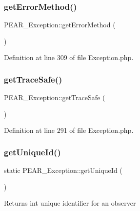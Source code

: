 \subsubsection{\texorpdfstring{get\+Error\+Method()}{getErrorMethod()}}
{\footnotesize\ttfamily P\+E\+A\+R\+\_\+\+Exception\+::get\+Error\+Method (\begin{DoxyParamCaption}{ }\end{DoxyParamCaption})}



Definition at line 309 of file Exception.\+php.

\mbox{\label{classPEAR__Exception_a6ddfe3065ec2af986b3e3fe267198515}} 
\subsubsection{\texorpdfstring{get\+Trace\+Safe()}{getTraceSafe()}}
{\footnotesize\ttfamily P\+E\+A\+R\+\_\+\+Exception\+::get\+Trace\+Safe (\begin{DoxyParamCaption}{ }\end{DoxyParamCaption})}



Definition at line 291 of file Exception.\+php.

\mbox{\label{classPEAR__Exception_af81b4e556fe7142e45ed9117b8cfb044}} 
\subsubsection{\texorpdfstring{get\+Unique\+Id()}{getUniqueId()}}
{\footnotesize\ttfamily static P\+E\+A\+R\+\_\+\+Exception\+::get\+Unique\+Id (\begin{DoxyParamCaption}{ }\end{DoxyParamCaption})\hspace{0.3cm}{\ttfamily [static]}}

\begin{DoxyReturn}{Returns}
int unique identifier for an observer 
\end{DoxyReturn}



